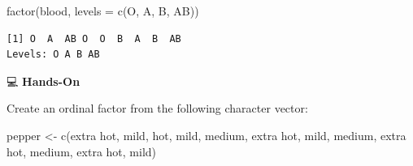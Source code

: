 \documentclass[
  letterpaper,
  DIV=11,
  numbers=noendperiod]{scrreprt}
\newenvironment{Shaded}{\begin{snugshade}}{\end{snugshade}}
\newcommand{\AttributeTok}[1]{\textcolor[rgb]{0.40,0.45,0.13}{#1}}
\newcommand{\FunctionTok}[1]{\textcolor[rgb]{0.28,0.35,0.67}{#1}}
\newcommand{\NormalTok}[1]{\textcolor[rgb]{0.00,0.23,0.31}{#1}}
\newcommand{\OtherTok}[1]{\textcolor[rgb]{0.00,0.23,0.31}{#1}}
\newcommand{\StringTok}[1]{\textcolor[rgb]{0.13,0.47,0.30}{#1}}
\begin{document}
\begin{tcolorbox}[enhanced jigsaw, colbacktitle=quarto-callout-tip-color!10!white, opacitybacktitle=0.6, breakable, left=2mm, leftrule=.75mm, toprule=.15mm, toptitle=1mm, bottomtitle=1mm, colframe=quarto-callout-tip-color-frame, opacityback=0, coltitle=black, arc=.35mm, titlerule=0mm, colback=white, bottomrule=.15mm, title=\textcolor{quarto-callout-tip-color}{\faLightbulb}\hspace{0.5em}{Answer}, rightrule=.15mm]

\begin{Shaded}
\begin{Highlighting}[]
\FunctionTok{factor}\NormalTok{(blood, }\AttributeTok{levels =} \FunctionTok{c}\NormalTok{(}\StringTok{\textquotesingle{}O\textquotesingle{}}\NormalTok{, }\StringTok{\textquotesingle{}A\textquotesingle{}}\NormalTok{, }\StringTok{\textquotesingle{}B\textquotesingle{}}\NormalTok{, }\StringTok{\textquotesingle{}AB\textquotesingle{}}\NormalTok{))}
\end{Highlighting}
\end{Shaded}

\begin{verbatim}
[1] O  A  AB O  O  B  A  B  AB
Levels: O A B AB
\end{verbatim}

\end{tcolorbox}

💻 \textbf{Hands-On}

Create an ordinal factor from the following character vector:

\begin{Shaded}
\begin{Highlighting}[]
\NormalTok{pepper }\OtherTok{\textless{}{-}} \FunctionTok{c}\NormalTok{(}\StringTok{\textquotesingle{}extra hot\textquotesingle{}}\NormalTok{, }\StringTok{\textquotesingle{}mild\textquotesingle{}}\NormalTok{, }\StringTok{\textquotesingle{}hot\textquotesingle{}}\NormalTok{, }\StringTok{\textquotesingle{}mild\textquotesingle{}}\NormalTok{, }\StringTok{\textquotesingle{}medium\textquotesingle{}}\NormalTok{, }\StringTok{\textquotesingle{}extra hot\textquotesingle{}}\NormalTok{, }
            \StringTok{\textquotesingle{}mild\textquotesingle{}}\NormalTok{, }\StringTok{\textquotesingle{}medium\textquotesingle{}}\NormalTok{, }\StringTok{\textquotesingle{}extra hot\textquotesingle{}}\NormalTok{, }\StringTok{\textquotesingle{}medium\textquotesingle{}}\NormalTok{, }\StringTok{\textquotesingle{}extra hot\textquotesingle{}}\NormalTok{, }\StringTok{\textquotesingle{}mild\textquotesingle{}}\NormalTok{)}
\end{Highlighting}
\end{Shaded}
\end{document}
